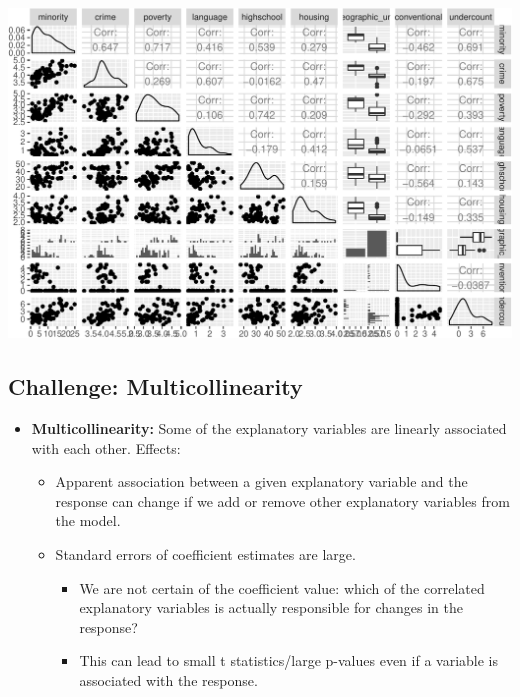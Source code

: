 \documentclass[landscape]{article}
\providecommand{\tightlist}{%
  \setlength{\itemsep}{0pt}\setlength{\parskip}{0pt}}
\begin{document}
\includegraphics{20190422_multicollinearity_files/figure-latex/unnamed-chunk-4-1.pdf}

\newpage

\subsection{Challenge:
Multicollinearity}\label{challenge-multicollinearity}

\begin{itemize}
\tightlist
\item
  \textbf{Multicollinearity:} Some of the explanatory variables are
  linearly associated with each other. Effects:

  \begin{itemize}
  \tightlist
  \item
    Apparent association between a given explanatory variable and the
    response can change if we add or remove other explanatory variables
    from the model.
  \item
    Standard errors of coefficient estimates are large.

    \begin{itemize}
    \tightlist
    \item
      We are not certain of the coefficient value: which of the
      correlated explanatory variables is actually responsible for
      changes in the response?
    \item
      This can lead to small t statistics/large p-values even if a
      variable is associated with the response.
    \end{itemize}
  \end{itemize}
\end{itemize}
\end{document}
